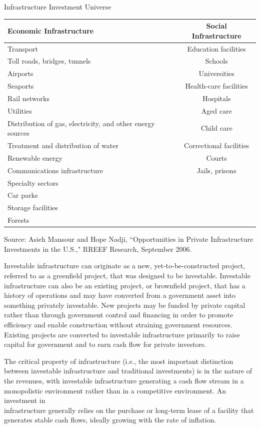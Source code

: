 \documentclass[11pt]{article}
\begin{document}
Infrastructure Investment Universe

\begin{center}
\begin{tabular}{|lc|}
\hline
Economic Infrastructure & Social Infrastructure \\
\hline
Transport & Education facilities \\
Toll roads, bridges, tunnels & Schools \\
Airports & Universities \\
Seaports & Health-care facilities \\
Rail networks & Hospitals \\
Utilities & Aged care \\
Distribution of gas, electricity, and other energy sources & Child care \\
Treatment and distribution of water & Correctional facilities \\
Renewable energy & Courts \\
Communications infrastructure & Jails, prisons \\
Specialty sectors &  \\
Car parks &  \\
Storage facilities &  \\
Forests &  \\
\end{tabular}
\end{center}

Source: Asieh Mansour and Hope Nadji, “Opportunities in Private Infrastructure Investments in the U.S.," RREEF Research, September 2006.

Investable infrastructure can originate as a new, yet-to-be-constructed project, referred to as a greenfield project, that was designed to be investable. Investable infrastructure can also be an existing project, or brownfield project, that has a history of operations and may have converted from a government asset into something privately investable. New projects may be funded by private capital rather than through government control and financing in order to promote efficiency and enable construction without straining government resources. Existing projects are converted to investable infrastructure primarily to raise capital for government and to earn cash flow for private investors.

The critical property of infrastructure (i.e., the most important distinction between investable infrastructure and traditional investments) is in the nature of the revenues, with investable infrastructure generating a cash flow stream in a monopolistic environment rather than in a competitive environment. An investment in\\
infrastructure generally relies on the purchase or long-term lease of a facility that generates stable cash flows, ideally growing with the rate of inflation.
\end{document}
